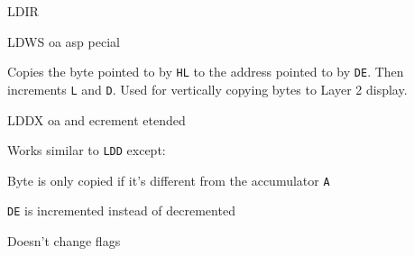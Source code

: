 \begin{basedescript}{
	\desclabelstyle{\multilinelabel}
	\desclabelwidth{3cm}}
\begin{DetailItem}{LDIR}
	\end{DetailItem}


	\label{DetailRefLDWS}
	\begin{DetailItem}{LDWS\ZXN}
		{oa asp pecial}
		{\SymLDWS}

		Copies the byte pointed to by {\tt HL} to the address pointed to by {\tt DE}. Then increments {\tt L} and {\tt D}. Used for vertically copying bytes to Layer 2 display.
			
		\begin{DetailEffects}[v]
			\FlagsLDWS
		\end{DetailEffects}
				
		\begin{DetailTiming}
		\end{DetailTiming}



	\end{DetailItem}

	\pagebreak
	\label{DetailRefLDDX}
	\begin{DetailItem}{LDDX\ZXN}
		{oa\IH{D} and ecrement etended}		
		{\SymLDDX}

		Works similar to {\tt LDD} except:
		\begin{DetailCompactList}
			\item Byte is only copied if it's different from the accumulator {\tt A}
			\item {\tt DE} is incremented instead of decremented
			\item Doesn't change flags
		\end{DetailCompactList}

		\begin{DetailEffects}
			\FlagsLDDX
		\end{DetailEffects}
				

\end{DetailItem}
\end{basedescript}
